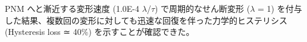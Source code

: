 \documentclass[uplatex,dvipdfmx,a4paper,11pt]{jsarticle}
\makeatletter
\def\section{\@startsection {section}{1}{\z@}{1.5 ex plus 2ex minus -.2ex}{0.5 ex plus .2ex}{\large\bf}}
\makeatother
\begin{document}
PNM へと漸近する変形速度 (1.0E-4 $\lambda$/$\tau$)  で周期的なせん断変形 ($\lambda$ = 1) を付与した結果、複数回の変形に対しても迅速な回復を伴った力学的ヒステリシス (Hysteresis loss
≃ 40\%) を示すことが確認できた。




\end{document}
